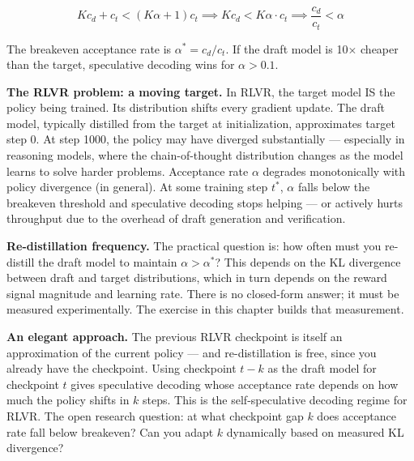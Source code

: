 $$K c_d + c_t < (K\alpha + 1) c_t \implies K c_d < K\alpha \cdot c_t \implies \frac{c_d}{c_t} < \alpha$$

The breakeven acceptance rate is $\alpha^* = c_d / c_t$. If the draft model is 10$\times$ cheaper than the target, speculative decoding wins for $\alpha > 0.1$.

\textbf{The RLVR problem: a moving target.} In RLVR, the target model IS the policy being trained. Its distribution shifts every gradient update. The draft model, typically distilled from the target at initialization, approximates target step 0. At step 1000, the policy may have diverged substantially --- especially in reasoning models, where the chain-of-thought distribution changes as the model learns to solve harder problems. Acceptance rate $\alpha$ degrades monotonically with policy divergence (in general). At some training step $t^*$, $\alpha$ falls below the breakeven threshold and speculative decoding stops helping --- or actively hurts throughput due to the overhead of draft generation and verification.

\textbf{Re-distillation frequency.} The practical question is: how often must you re-distill the draft model to maintain $\alpha > \alpha^*$? This depends on the KL divergence between draft and target distributions, which in turn depends on the reward signal magnitude and learning rate. There is no closed-form answer; it must be measured experimentally. The exercise in this chapter builds that measurement.

\textbf{An elegant approach.} The previous RLVR checkpoint is itself an approximation of the current policy --- and re-distillation is free, since you already have the checkpoint. Using checkpoint $t-k$ as the draft model for checkpoint $t$ gives speculative decoding whose acceptance rate depends on how much the policy shifts in $k$ steps. This is the self-speculative decoding regime for RLVR. The open research question: at what checkpoint gap $k$ does acceptance rate fall below breakeven? Can you adapt $k$ dynamically based on measured KL divergence?

